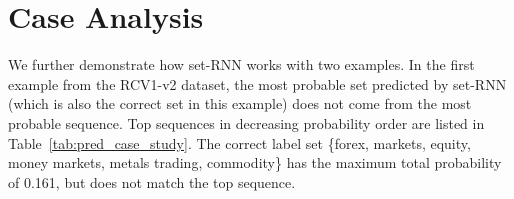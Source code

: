 \section{Case Analysis}
We further demonstrate how set-RNN works with two examples.
In the first example from the RCV1-v2 dataset, the most probable set predicted by set-RNN (which is also the correct set in this example) does not come from the most probable sequence. Top sequences in decreasing probability order are listed in Table~\ref{tab:pred_case_study}. The correct label set \{forex, markets, equity, money markets, metals trading, commodity\} has the maximum total probability of 0.161, but does not match the top sequence.

